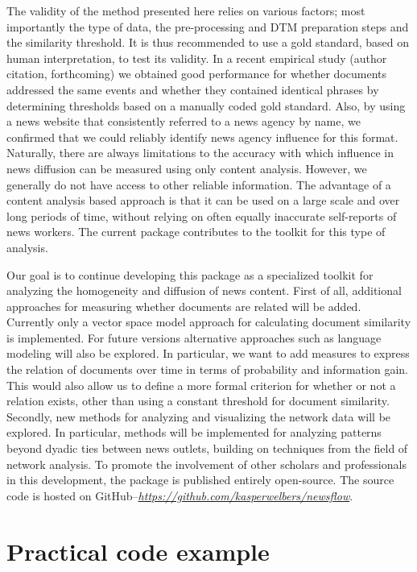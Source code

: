 \documentclass[]{article}
\begin{document}
The validity of the method presented here relies on various factors;
most importantly the type of data, the pre-processing and DTM
preparation steps and the similarity threshold. It is thus recommended
to use a gold standard, based on human interpretation, to test its
validity. In a recent empirical study (author citation, forthcoming) we
obtained good performance for whether documents addressed the same
events and whether they contained identical phrases by determining
thresholds based on a manually coded gold standard. Also, by using a
news website that consistently referred to a news agency by name, we
confirmed that we could reliably identify news agency influence for this
format. Naturally, there are always limitations to the accuracy with
which influence in news diffusion can be measured using only content
analysis. However, we generally do not have access to other reliable
information. The advantage of a content analysis based approach is that
it can be used on a large scale and over long periods of time, without
relying on often equally inaccurate self-reports of news workers. The
current package contributes to the toolkit for this type of analysis.

Our goal is to continue developing this package as a specialized toolkit
for analyzing the homogeneity and diffusion of news content. First of
all, additional approaches for measuring whether documents are related
will be added. Currently only a vector space model approach for
calculating document similarity is implemented. For future versions
alternative approaches such as language modeling will also be explored.
In particular, we want to add measures to express the relation of
documents over time in terms of probability and information gain. This
would also allow us to define a more formal criterion for whether or not
a relation exists, other than using a constant threshold for document
similarity. Secondly, new methods for analyzing and visualizing the
network data will be explored. In particular, methods will be
implemented for analyzing patterns beyond dyadic ties between news
outlets, building on techniques from the field of network analysis. To
promote the involvement of other scholars and professionals in this
development, the package is published entirely open-source. The source
code is hosted on
GitHub--\emph{\url{https://github.com/kasperwelbers/newsflow}}.

\section{Practical code example}\label{practical-code-example}
\end{document}
